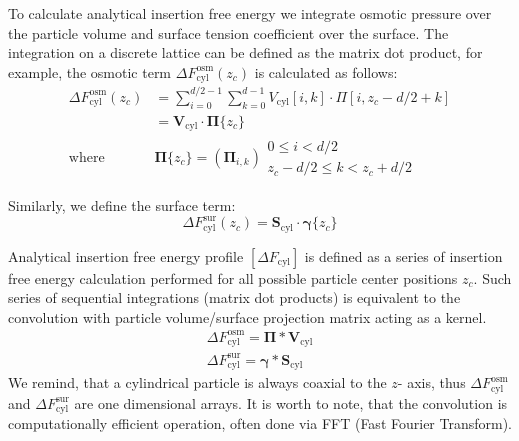 \documentclass[10pt, a4paper]{article}
\begin{document}
\begin{multicols}{2}
To calculate analytical insertion free energy we integrate osmotic pressure over the particle volume and surface tension coefficient over the surface.
The integration on a discrete lattice can be defined as the matrix dot product, for example, the osmotic term $\Delta F_{\textrm{cyl}}^{\textrm{osm}}(z_c)$ is calculated as follows:
\begin{equation}\label{eq:cyl_fe_osm}
    \begin{split}
        \Delta F_{\textrm{cyl}}^{\textrm{osm}}(z_c) &= \sum_{i=0}^{d/2-1} \sum_{k=0}^{d-1} V_{\textrm{cyl}}[i, k] \cdot \Pi[i, z_c-d/2+k] 
        \\   &= \mathbf{V}_{\textrm{cyl}} \cdot  \bm{\Pi}\{z_c\}
        \\ \text{where } &\bm{\Pi}\{z_c\} =\left(\bm{\Pi}_{i,k}\right) {\substack{0 \le i < d/2 \\ z_c-d/2 \le k < z_c+d/2}}
    \end{split}
\end{equation} 

Similarly, we define the surface term:
\begin{equation}\label{eq:cyl_fe_sur}
    \Delta F_{\textrm{cyl}}^{\textrm{sur}}(z_c) = \mathbf{S}_{\textrm{cyl}} \cdot  \bm{\gamma}\{z_c\}
\end{equation}

Analytical insertion free energy profile $\left[\Delta F_{\textrm{cyl}}\right]$ is defined as a series of insertion free energy calculation performed for all possible particle center positions $z_c$.
Such series of sequential integrations (matrix dot products) is equivalent to the convolution with particle volume/surface projection matrix acting as a kernel.
\begin{eqnarray}
    \Delta F_{\textrm{cyl}}^{\textrm{osm}} = \mathbf{\Pi} \ast \mathbf{V}_{\textrm{cyl}}
    \\
    \Delta F_{\textrm{cyl}}^{\textrm{sur}} = \bm{\gamma} \ast \mathbf{S}_{\textrm{cyl}}
\end{eqnarray}
We remind, that a cylindrical particle is always coaxial to the $z$- axis, thus $\Delta F_{\textrm{cyl}}^{\textrm{osm}}$ and  $\Delta F_{\textrm{cyl}}^{\textrm{sur}}$ are one dimensional arrays.
It is worth to note, that the convolution is computationally efficient operation, often done via FFT (Fast Fourier Transform).


\end{multicols}

\end{document}
